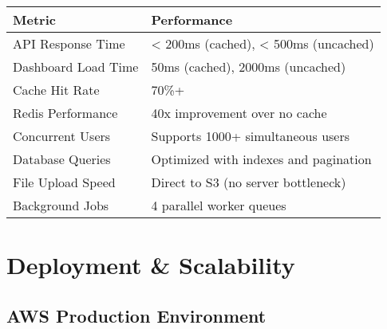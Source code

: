 \documentclass[11pt,a4paper]{article}
\begin{document}
\begin{table}[H]
\centering
\begin{tabular}{p{5cm}p{9cm}}
\toprule
\textbf{Metric} & \textbf{Performance} \\
\midrule
API Response Time & < 200ms (cached), < 500ms (uncached) \\
Dashboard Load Time & 50ms (cached), 2000ms (uncached) \\
Cache Hit Rate & 70\%+ \\
Redis Performance & 40x improvement over no cache \\
Concurrent Users & Supports 1000+ simultaneous users \\
Database Queries & Optimized with indexes and pagination \\
File Upload Speed & Direct to S3 (no server bottleneck) \\
Background Jobs & 4 parallel worker queues \\
\bottomrule
\end{tabular}
\end{table}

\newpage

\section{Deployment \& Scalability}

\subsection{AWS Production Environment}
\end{document}
